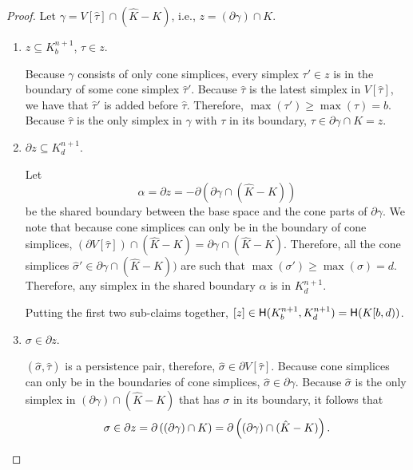 \documentclass[cleveref,a4paper,english,nolineno]{socg-lipics-v2021}
\newcommand{\Hgr}{{\sf H}}
\newcommand{\cone}[1]{\hat{#1}}
\newcommand{\bdry}{\partial}
\newcommand{\cK}{\cone{K}}
\newcommand{\supK}[1]{K_{#1}^{n+1}}
\newcommand{\ssx}{\sigma}
\newcommand{\tsx}{\tau}
\newcommand{\cssx}{\cone{\ssx}}
\newcommand{\ctsx}{\cone{\tsx}}
\begin{document}
    \begin{proof}
        Let $\gamma = V[\ctsx] \cap (\cK - K)$, i.e., $z = \left( \bdry \gamma \right) \cap K$.

        \begin{enumerate}
            \item
                $z \subseteq \supK{b}$, $\tsx \in z$.


                Because $\gamma$ consists of only cone simplices, every simplex
                $\tsx' \in z$ is in the boundary of some cone simplex
                $\ctsx'$. Because
                $\ctsx$ is the latest simplex in $V[\ctsx]$, we have that
                $\ctsx'$ is added before $\ctsx$. Therefore,
                $\max(\tsx') \geq \max(\tsx) = b$.
                Because $\ctsx$ is the only simplex in $\gamma$ with $\tsx$ in
                its boundary, $\tsx \in \bdry \gamma \cap K = z$.

            \item
                $\bdry z \subseteq \supK{d}$.

                Let
                \[
                    \alpha = \bdry z = - \bdry \left( \bdry \gamma \cap (\cK - K) \right)
                \]
                be the shared boundary between the base space and the
                cone parts of $\bdry \gamma$.
                We note that because cone simplices can only be in the boundary
                of cone simplices,
                $( \bdry V[\ctsx] ) \cap (\cK - K) = \bdry \gamma \cap (\cK - K)$.
                Therefore, all the cone simplices $\cssx' \in \bdry \gamma \cap (\cK - K))$
                are such that $\max(\ssx') \geq \max(\ssx) = d$. Therefore, any
                simplex in the shared boundary $\alpha$ is in $\supK{d}$.

                Putting the first two sub-claims together, $[z] \in \Hgr(\supK{b}, \supK{d}) = \Hgr(K[b,d))$.
            \item
                $\ssx \in \bdry z$.

                $(\cssx, \ctsx)$ is a persistence pair, therefore, $\cssx \in \bdry V[\ctsx]$.
                Because cone simplices can only be
                in the boundaries of cone simplices, $\cssx \in \bdry \gamma$.
                Because $\cssx$ is the only simplex in $\left( \bdry \gamma \right) \cap (\cK - K)$
                that has $\ssx$ in its boundary, it follows that
                \[
                    \ssx \in \bdry z
                        = \bdry \left( \left( \bdry \gamma \right) \cap K \right)
                        = \bdry \left( \left( \bdry \gamma \right) \cap (\cK - K) \right).
                \qedhere
                \]
        \end{enumerate}
    \end{proof}
\end{document}
